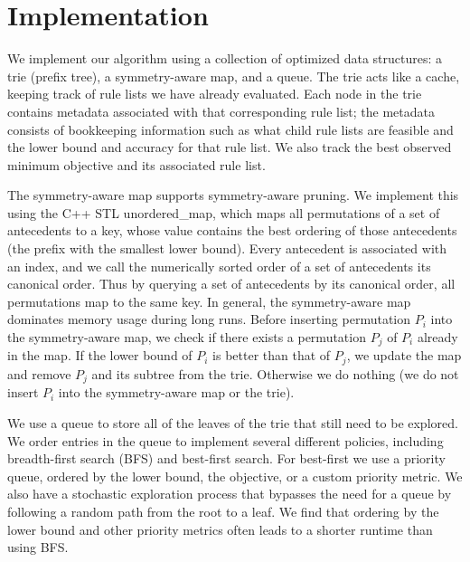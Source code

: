 \section{Implementation}
\label{sec:implementation}



We implement our algorithm using a collection of optimized data structures:
a trie (prefix tree), a symmetry-aware map, and a queue.
The trie acts like a cache, keeping track of rule lists we have already evaluated.
Each node in the trie contains metadata associated with that corresponding rule list;
the metadata consists of bookkeeping information such as what child rule lists are feasible and
the lower bound and accuracy for that rule list.
We also track the best observed minimum objective and its associated rule list.

The symmetry-aware map supports symmetry-aware pruning.
%
We implement this using the C++ STL unordered\_map, which
maps all permutations of a set of antecedents to a key, whose value
contains the best ordering of those antecedents (\ie the prefix with the smallest lower bound).
%
Every antecedent is associated with an index, and we call the numerically
sorted order of a set of antecedents its canonical order.
%
Thus by querying a set of antecedents by its canonical order, all
permutations map to the same key.
%
%
In general, the symmetry-aware map dominates memory usage during long runs.
Before inserting permutation $P_i$ into the symmetry-aware map, we check
if there exists a permutation $P_j$ of $P_i$ already in the map.
If the lower bound of $P_i$ is better than that of $P_j$,
we update the map and remove $P_j$ and its subtree from the trie.
Otherwise we do nothing (\ie we do not insert $P_i$ into the symmetry-aware map
or the trie).

We use a queue to store all of the leaves of the trie that still need to be explored.
%
We order entries in the queue to implement several different policies,
including breadth-first search (BFS) and best-first search.
%
For best-first we use a priority queue, ordered by the lower bound, the objective,
or a custom priority metric.
%
We also have a stochastic exploration process that bypasses the need for a queue by
following a random path from the root to a leaf.
%
We find that ordering by the lower bound and other priority metrics
often leads to a shorter runtime than using BFS.

